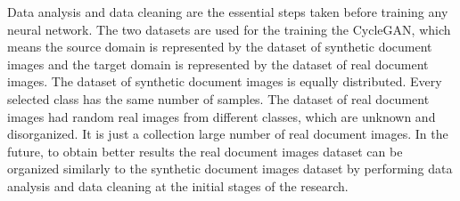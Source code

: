 Data analysis and data cleaning are the essential steps taken before training any neural network. The two datasets are used for the training the \ac{CycleGAN}, which means the source domain is represented by the dataset of synthetic document images and the target domain is represented by the dataset of real document images. The dataset of synthetic document images is equally distributed. Every selected class has the same number of samples. The dataset of real document images had random real images from different classes, which are unknown and disorganized. It is just a collection large number of real document images. In the future, to obtain better results the real document images dataset can be organized similarly to the synthetic document images dataset by performing data analysis and data cleaning at the initial stages of the research.




























